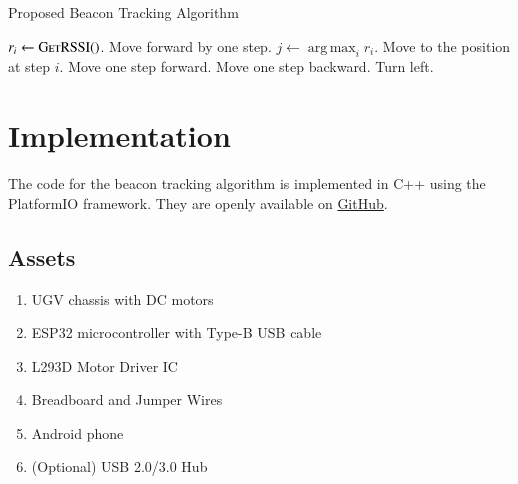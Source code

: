 \documentclass[conference]{IEEEtran}
\DeclareMathOperator*{\argmax}{arg\,max}
\begin{document}
\begin{algorithm}[H]
    \caption{Proposed Beacon Tracking Algorithm}
    \label{alg:beacon}
    \begin{algorithmic}[1]
                \State \(r_i \gets \textsc{GetRSSI()}\).
                \State Move forward by one step.
            \EndFor
            \State \(j \gets \argmax_{i} r_i\).
            \State Move to the position at step \(i\).
                \State Move one step forward.
                \State Move one step backward.
            \Else
                \State Turn left.
            \EndIf
        \EndWhile
    \end{algorithmic}
\end{algorithm}

\section{Implementation}
\label{sec:implementation}

The code for the beacon tracking algorithm is implemented in C++ using the
PlatformIO framework. They are openly available on
\href{https://github.com/goats-9/ee2802/main/ugv-beacon/codes}{GitHub}.

\subsection{Assets}
\begin{enumerate}
    \item UGV chassis with DC motors
    \item ESP32 microcontroller with Type-B USB cable
    \item L293D Motor Driver IC
    \item Breadboard and Jumper Wires
    \item Android phone
    \item (Optional) USB 2.0/3.0 Hub
\end{enumerate}
\end{document}
